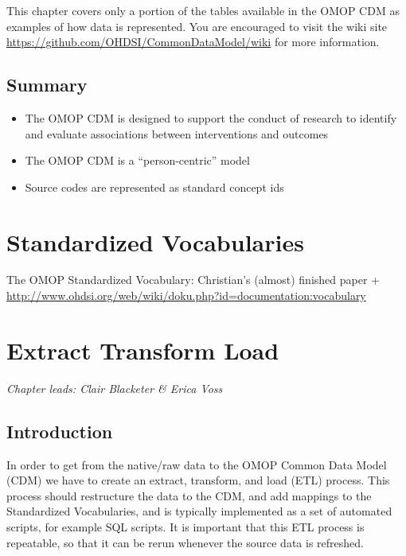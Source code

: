 \documentclass[11pt]{book}
\theoremstyle{definition}
\theoremstyle{definition}
\theoremstyle{definition}
\theoremstyle{remark}
\let\BeginKnitrBlock\begin \let\EndKnitrBlock\end
\begin{document}
This chapter covers only a portion of the tables available in the OMOP CDM as examples of how data is represented. You are encouraged to visit the wiki site \url{https://github.com/OHDSI/CommonDataModel/wiki} for more information.

\hypertarget{summary-2}{%
\section{Summary}\label{summary-2}}

\BeginKnitrBlock{rmdsummary}
\begin{itemize}
\item
  The OMOP CDM is designed to support the conduct of research to identify and evaluate associations between interventions and outcomes
\item
  The OMOP CDM is a ``person-centric'' model
\item
  Source codes are represented as standard concept ids
\end{itemize}
\EndKnitrBlock{rmdsummary}

\hypertarget{StandardizedVocabularies}{%
\chapter{Standardized Vocabularies}\label{StandardizedVocabularies}}

The OMOP Standardized Vocabulary: Christian's (almost) finished paper + \url{http://www.ohdsi.org/web/wiki/doku.php?id=documentation:vocabulary}

\hypertarget{ExtractTransformLoad}{%
\chapter{Extract Transform Load}\label{ExtractTransformLoad}}

\emph{Chapter leads: Clair Blacketer \& Erica Voss}

\hypertarget{introduction}{%
\section{Introduction}\label{introduction}}

In order to get from the native/raw data to the OMOP Common Data Model (CDM) we have to create an extract, transform, and load (ETL) process. This process should restructure the data to the CDM, and add mappings to the Standardized Vocabularies, and is typically implemented as a set of automated scripts, for example SQL scripts. It is important that this ETL process is repeatable, so that it can be rerun whenever the source data is refreshed.
\end{document}
